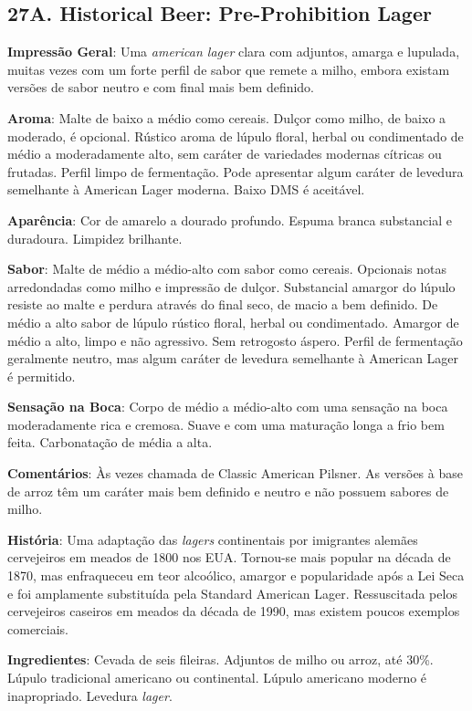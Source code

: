 \subsection*{27A. Historical Beer: Pre-Prohibition Lager}
\textbf{Impressão Geral}: Uma \textit{american lager} clara com adjuntos, amarga e lupulada, muitas vezes com um forte perfil de sabor que remete a milho, embora existam versões de sabor neutro e com final mais bem definido.

\textbf{Aroma}: Malte de baixo a médio como cereais. Dulçor como milho, de baixo a moderado, é opcional. Rústico aroma de lúpulo floral, herbal ou condimentado de médio a moderadamente alto, sem caráter de variedades modernas cítricas ou frutadas. Perfil limpo de fermentação. Pode apresentar algum caráter de levedura semelhante à American Lager moderna. Baixo DMS é aceitável.

\textbf{Aparência}: Cor de amarelo a dourado profundo. Espuma branca substancial e duradoura. Limpidez brilhante.

\textbf{Sabor}: Malte de médio a médio-alto com sabor como cereais. Opcionais notas arredondadas como milho e impressão de dulçor. Substancial amargor do lúpulo resiste ao malte e perdura através do final seco, de macio a bem definido. De médio a alto sabor de lúpulo rústico floral, herbal ou condimentado. Amargor de médio a alto, limpo e não agressivo. Sem retrogosto áspero. Perfil de fermentação geralmente neutro, mas algum caráter de levedura semelhante à American Lager é permitido.

\textbf{Sensação na Boca}: Corpo de médio a médio-alto com uma sensação na boca moderadamente rica e cremosa. Suave e com uma maturação longa a frio bem feita. Carbonatação de média a alta.

\textbf{Comentários}: Às vezes chamada de Classic American Pilsner. As versões à base de arroz têm um caráter mais bem definido e neutro e não possuem sabores de milho.

\textbf{História}: Uma adaptação das \textit{lagers} continentais por imigrantes alemães cervejeiros em meados de 1800 nos EUA. Tornou-se mais popular na década de 1870, mas enfraqueceu em teor alcoólico, amargor e popularidade após a Lei Seca e foi amplamente substituída pela Standard American Lager. Ressuscitada pelos cervejeiros caseiros em meados da década de 1990, mas existem poucos exemplos comerciais.

\textbf{Ingredientes}: Cevada de seis fileiras. Adjuntos de milho ou arroz, até 30\%. Lúpulo tradicional americano ou continental. Lúpulo americano moderno é inapropriado. Levedura \textit{lager}.

